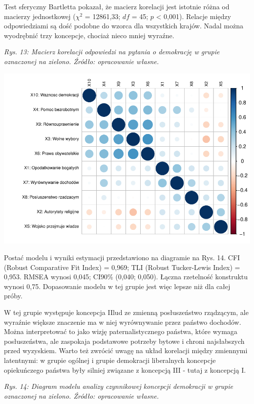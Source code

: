 \documentclass[12pt]{article}
\begin{document}
Test sferyczny Bartletta pokazał, że macierz korelacji jest istotnie różna od macierzy jednostkowej (\(\chi^2\) = 12861,33; \(df\) = 45; \(p\) \textless{} 0,001). Relacje między odpowiedziami są dość podobne do wzorca dla wszystkich krajów. Nadal można wyodrębnić trzy koncepcje, chociaż nieco mniej wyraźne.

\emph{Rys. 13: Macierz korelacji odpowiedzi na pytania o demokrację w grupie oznaczonej na zielono. Źródło: opracowanie własne.}

\begin{flushleft}\includegraphics{text_ASA_files/figure-latex/cor-matrix-1-1} \end{flushleft}

Postać modelu i wyniki estymacji przedstawiono na diagramie na Rys. 14. CFI (Robust Comparative Fit Index) = 0,969; TLI (Robust Tucker-Lewis Index) = 0,953. RMSEA wynosi 0,045; CI90\% (0,040; 0,050). Łączna rzetelność konstruktu wynosi 0,75. Dopasowanie modelu w tej grupie jest więc lepsze niż dla całej próby.

W tej grupie występuje koncepcja IIlud ze zmienną posłuszeństwo rządzącym, ale wyraźnie większe znaczenie ma w niej wyrównywanie przez państwo dochodów. Można interpretować to jako wizję paternalistycznego państwa, które wymaga posłuszeństwa, ale zaspokaja podstawowe potrzeby bytowe i chroni najsłabszych przed wyzyskiem. Warto też zwrócić uwagę na układ korelacji między zmiennymi latentnymi: w grupie ogólnej i grupie demokracji liberalnych koncepcje opiekuńczego państwa były silniej związane z koncepcją III - tutaj z koncepcją I.

\emph{Rys. 14: Diagram modelu analizy czynnikowej koncepcji demokracji w grupie oznaczonej na zielono. Źródło: opracowanie własne.}
\end{document}

